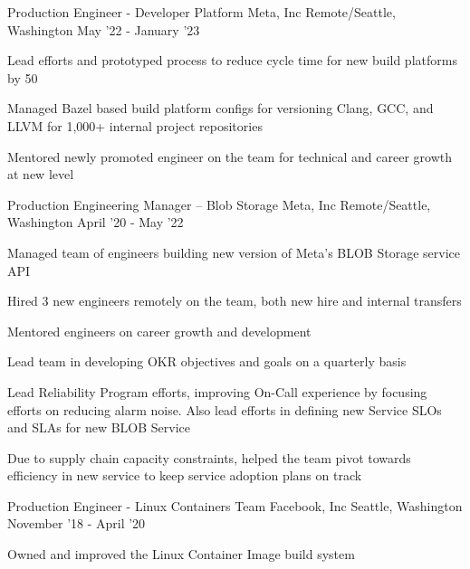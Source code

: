 \begin{cventries}
\cventry
    {Production Engineer - Developer Platform} %
    {Meta, Inc} %
    {Remote/Seattle, Washington} %
    {May '22 - January '23} %
    {
        \begin{cvitems}
          \item Lead efforts and prototyped process to reduce cycle time for new build platforms by 50%
          \item Managed Bazel based build platform configs for versioning Clang, GCC, and LLVM for 1,000+ internal project repositories
          \item Mentored newly promoted engineer on the team for technical and career growth at new level
        \end{cvitems}
    }
\vspace{4mm}
\cventry
    {Production Engineering Manager – Blob Storage} %
    {Meta, Inc} %
    {Remote/Seattle, Washington} %
    {April '20 - May '22} %
    {
        \begin{cvitems}
          \item Managed team of engineers building new version of Meta’s BLOB Storage service API
		  \item Hired 3 new engineers remotely on the team, both new hire and internal transfers
		  \item Mentored engineers on career growth and development
		  \item Lead team in developing OKR objectives and goals on a quarterly basis
          \item Lead Reliability Program efforts, improving On-Call experience by focusing efforts on reducing alarm noise. Also lead efforts in defining new Service SLOs and SLAs for new BLOB Service
          \item Due to supply chain capacity constraints, helped the team pivot towards efficiency in new service to keep service adoption plans on track
        \end{cvitems}
    }
\vspace{4mm}
\cventry
    {Production Engineer - Linux Containers Team} %
    {Facebook, Inc} %
    {Seattle, Washington} %
    {November '18 - April '20} %
    {
        \begin{cvitems}
          \item Owned and improved the Linux Container Image build system

\end{cvitems}}
\end{cventries}
